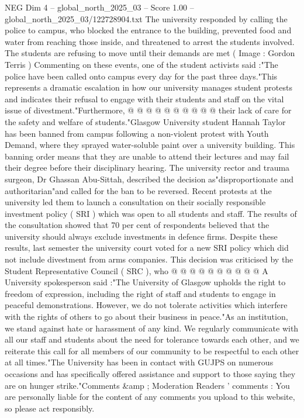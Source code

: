 \begin{textsample}{NEG Dim 4 – global\_north\_2025\_03 – Score 1.00 – global\_north\_2025\_03/122728904.txt}
The university responded by calling the police to campus, who blocked the entrance to the building, prevented food and water from reaching those inside, and threatened to arrest the students involved.
The students are refusing to move until their demands are met ( Image : Gordon Terris ) Commenting on these events, one of the student activists said :"The police have been called onto campus every day for the past three days."This represents a dramatic escalation in how our university manages student protests and indicates their refusal to engage with their students and staff on the vital issue of divestment."Furthermore, @ @ @ @ @ @ @ @ @ @ their lack of care for the safety and welfare of students."Glasgow University student Hannah Taylor has been banned from campus following a non-violent protest with Youth Demand, where they sprayed water-soluble paint over a university building.
This banning order means that they are unable to attend their lectures and may fail their degree before their disciplinary hearing.
The university rector and trauma surgeon, Dr Ghassan Abu-Sittah, described the decision as"disproportionate and authoritarian"and called for the ban to be reversed.
Recent protests at the university led them to launch a consultation on their socially responsible investment policy ( SRI ) which was open to all students and staff.
The results of the consultation showed that 70 per cent of respondents believed that the university should always exclude investments in defence firms.
Despite these results, last semester the university court voted for a new SRI policy which did not include divestment from arms companies.
This decision was criticised by the Student Representative Council ( SRC ), who @ @ @ @ @ @ @ @ @ @ A University spokesperson said :"The University of Glasgow upholds the right to freedom of expression, including the right of staff and students to engage in peaceful demonstrations.
However, we do not tolerate activities which interfere with the rights of others to go about their business in peace."As an institution, we stand against hate or harassment of any kind.
We regularly communicate with all our staff and students about the need for tolerance towards each other, and we reiterate this call for all members of our community to be respectful to each other at all times."The University has been in contact with GUJPS on numerous occasions and has specifically offered assistance and support to those saying they are on hunger strike."Comments \&amp ; Moderation Readers ' comments : You are personally liable for the content of any comments you upload to this website, so please act responsibly.

\end{textsample}
